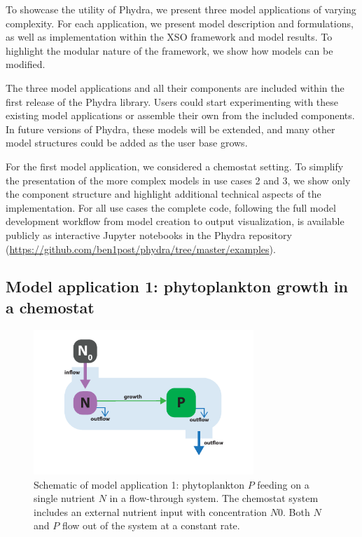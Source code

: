 \documentclass[journal abbreviation, manuscript]{copernicus}
\begin{document}
To showcase the utility of Phydra, we present three model applications of varying complexity. For each application, we present model description and formulations, as well as implementation within the XSO framework and model results. To highlight the modular nature of the framework, we show how models can be modified.

The three model applications and all their components are included within the first release of the Phydra library. Users could start experimenting with these existing model applications or assemble their own from the included components. In future versions of Phydra, these models will be extended, and many other model structures could be added as the user base grows.

For the first model application, we considered a chemostat setting. To simplify the presentation of the more complex models in use cases 2 and 3, we show only the component structure and highlight additional technical aspects of the implementation. For all use cases the complete code, following the full model development workflow from model creation to output visualization, is available publicly as interactive Jupyter notebooks in the Phydra repository (\url{https://github.com/ben1post/phydra/tree/master/examples}).

\subsection{Model application 1: phytoplankton growth in a chemostat}

\begin{figure}[t]
\includegraphics[width=8.3cm]{Figures/firstdraft_schematics/01_schematics_Chemostat.pdf}
\caption{Schematic of model application 1: phytoplankton $P$ feeding on a single nutrient $N$ in a flow-through system. The chemostat system includes an external nutrient input with concentration $N0$. Both $N$ and $P$ flow out of the system at a constant rate.}
\label{Figure:ModelSchematics_1}
\end{figure}
\end{document}
